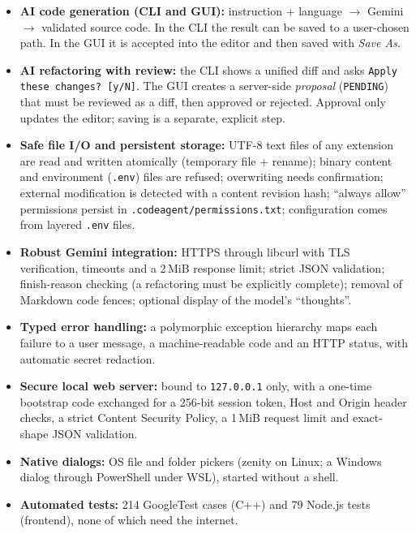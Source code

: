 \documentclass[12pt,a4paper,oneside]{book}
\begin{document}
\begin{itemize}
  \item \textbf{AI code generation (CLI and GUI):} instruction + language
    $\rightarrow$ Gemini $\rightarrow$ validated source code. In the CLI the
    result can be saved to a user-chosen path. In the GUI it is accepted into
    the editor and then saved with \emph{Save As}.
  \item \textbf{AI refactoring with review:} the CLI shows a unified diff and
    asks \texttt{Apply these changes? [y/\allowbreak{}N]}. The GUI creates a server-side
    \emph{proposal} (\texttt{PENDING}) that must be reviewed as a diff, then
    approved or rejected. Approval only updates the editor; saving is a
    separate, explicit step.
  \item \textbf{Safe file I/O and persistent storage:} UTF-8 text files of
    any extension are read and written atomically (temporary file + rename);
    binary content and environment (\texttt{.env}) files are refused;
    overwriting needs confirmation; external modification is detected with a
    content revision hash; ``always allow'' permissions persist in
    \texttt{.codeagent/\allowbreak{}\allowbreak permissions.txt}; configuration comes
    from layered \texttt{.env} files.
  \item \textbf{Robust Gemini integration:} HTTPS through libcurl with TLS
    verification, timeouts and a 2\,MiB response limit; strict JSON
    validation; finish-reason checking (a refactoring must be explicitly
    complete); removal of Markdown code fences; optional display of the
    model's ``thoughts''.
  \item \textbf{Typed error handling:} a polymorphic exception hierarchy maps
    each failure to a user message, a machine-readable code and an HTTP
    status, with automatic secret redaction.
  \item \textbf{Secure local web server:} bound to \texttt{127.0.0.1}
    only, with a one-time bootstrap code exchanged for a 256-bit session
    token, Host and Origin header checks, a strict Content Security Policy, a
    1\,MiB request limit and exact-shape JSON validation.
  \item \textbf{Native dialogs:} OS file and folder pickers (zenity on Linux;
    a Windows dialog through PowerShell under WSL), started without a shell.
  \item \textbf{Automated tests:} 214 GoogleTest cases (C++) and 79 Node.js
    tests (frontend), none of which need the internet.
\end{itemize}
\end{document}
